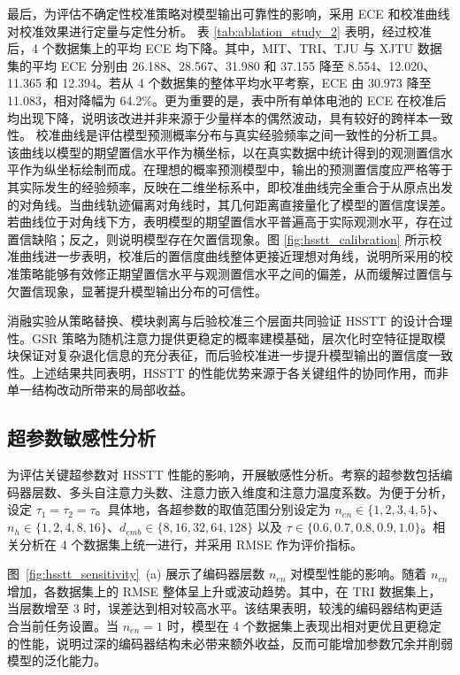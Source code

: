 最后，为评估不确定性校准策略对模型输出可靠性的影响，采用 ECE 和校准曲线对校准效果进行定量与定性分析。
表 \ref{tab:ablation_study_2} 表明，经过校准后，4 个数据集上的平均 ECE 均下降。其中，MIT、TRI、TJU 与 XJTU 数据集的平均 ECE 分别由 26.188、28.567、31.980 和 37.155 降至 8.554、12.020、11.365 和 12.394。若从 4 个数据集的整体平均水平考察，ECE 由 30.973 降至 11.083，相对降幅为 64.2\%。更为重要的是，表中所有单体电池的 ECE 在校准后均出现下降，说明该改进并非来源于少量样本的偶然波动，具有较好的跨样本一致性。
校准曲线是评估模型预测概率分布与真实经验频率之间一致性的分析工具。该曲线以模型的期望置信水平作为横坐标，以在真实数据中统计得到的观测置信水平作为纵坐标绘制而成。在理想的概率预测模型中，输出的预测置信度应严格等于其实际发生的经验频率，反映在二维坐标系中，即校准曲线完全重合于从原点出发的对角线。当曲线轨迹偏离对角线时，其几何距离直接量化了模型的置信度误差。若曲线位于对角线下方，表明模型的期望置信水平普遍高于实际观测水平，存在过置信缺陷；反之，则说明模型存在欠置信现象。图 \ref{fig:hsstt_calibration} 所示校准曲线进一步表明，校准后的置信度曲线整体更接近理想对角线，说明所采用的校准策略能够有效修正期望置信水平与观测置信水平之间的偏差，从而缓解过置信与欠置信现象，显著提升模型输出分布的可信性。

消融实验从策略替换、模块剥离与后验校准三个层面共同验证 HSSTT 的设计合理性。GSR 策略为随机注意力提供更稳定的概率建模基础，层次化时空特征提取模块保证对复杂退化信息的充分表征，而后验校准进一步提升模型输出的置信度一致性。上述结果共同表明，HSSTT 的性能优势来源于各关键组件的协同作用，而非单一结构改动所带来的局部收益。

\subsection{超参数敏感性分析}\label{subsec:HSSTT_sensitivity_analysis}

为评估关键超参数对 HSSTT 性能的影响，开展敏感性分析。考察的超参数包括编码器层数、多头自注意力头数、注意力嵌入维度和注意力温度系数。为便于分析，设定 $\tau_{1}=\tau_{2}=\tau$。具体地，各超参数的取值范围分别设定为 $n_{en} \in \{1,2,3,4,5\}$、$n_{h} \in \{1,2,4,8,16\}$、$d_{emb} \in \{8,16,32,64,128\}$ 以及 $\tau \in \{0.6,0.7,0.8,0.9,1.0\}$。相关分析在 4 个数据集上统一进行，并采用 RMSE 作为评价指标。

图~\ref{fig:hsstt_sensitivity}~(a) 展示了编码器层数 $n_{en}$ 对模型性能的影响。随着 $n_{en}$ 增加，各数据集上的 RMSE 整体呈上升或波动趋势。其中，在 TRI 数据集上，当层数增至 3 时，误差达到相对较高水平。该结果表明，较浅的编码器结构更适合当前任务设置。当 $n_{en}=1$ 时，模型在 4 个数据集上表现出相对更优且更稳定的性能，说明过深的编码器结构未必带来额外收益，反而可能增加参数冗余并削弱模型的泛化能力。


